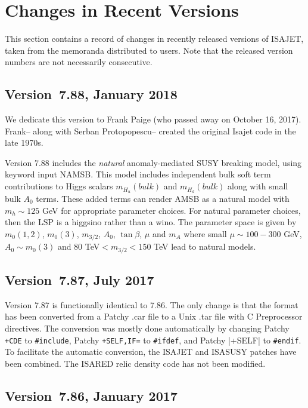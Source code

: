 \newpage
\section{Changes in Recent Versions}

        This section contains a record of changes in recently released
versions of ISAJET, taken from the memoranda distributed to users.
Note that the released version numbers are not necessarily consecutive.

\subsection{Version~7.88, January 2018}

We dedicate this version to Frank Paige (who passed away on October 16, 2017). 
Frank-- along with Serban Protopopescu--
created the original Isajet code in the late 1970s.

Version 7.88 includes the {\it natural} anomaly-mediated SUSY breaking model,
using keyword input NAMSB. This model includes independent bulk soft term 
contributions to Higgs scalars $m_{H_u}(bulk)$ and $m_{H_d}(bulk)$ along with
small bulk $A_0$ terms. These added terms can render AMSB as a natural
model with $m_h\sim 125$ GeV for appropriate parameter choices.
For natural parameter choices, then the LSP is a higgsino rather than a wino.
The parameter space is given by $m_0(1,2)$, $m_0(3)$, $m_{3/2}$, $A_0$,
$\tan\beta$, $\mu$ and $m_A$ where small $\mu\sim 100-300$ GeV,
$A_0\sim m_0(3)$ and 80 TeV$<m_{3/2}<150$ TeV lead to natural models.

\subsection{Version~7.87, July 2017}

Version 7.87 is functionally identical to 7.86. The only change is that
the format has been converted from a Patchy .car file to a Unix .tar
file with C Preprocessor directives. The conversion was mostly done
automatically by changing Patchy \verb|+CDE| to \verb|#include|,
Patchy \verb|+SELF,IF=| to \verb|#ifdef|, and Patchy |+SELF| to
\verb|#endif|. To facilitate the automatic conversion, the ISAJET and
ISASUSY patches have been combined. The ISARED relic density code has
not been modified.

\subsection{Version~7.86, January 2017}

